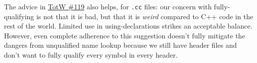 The advice in \hyperref[ch:tip-of-the-week-119]{TotW \#119} also helps, for \texttt{.cc} files: our concern with fully-qualifying is not that it is bad, but that it is \emph{weird} compared to C++ code in the rest of the world. Limited use in using-declarations strikes an acceptable balance. However, even complete adherence to this suggestion doesn’t fully mitigate the dangers from unqualified name lookup because we still have header files and don’t want to fully qualify every symbol in every header.


